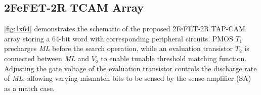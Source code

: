 

\subsection{2FeFET-2R TCAM Array}

\autoref{fig:1x64} demonstrates the schematic of the proposed 2FeFET-2R TAP-CAM array storing a 64-bit word with corresponding peripheral circuits. 
PMOS $\textit{T}_\text{1}$ precharges \textit{ML} before the search operation, while an evaluation transistor $\textit{T}_\text{2}$ is connected between \textit{ML} and $\textit{V}_\text{o}$ to enable tunable threshold matching function. 
Adjusting the gate voltage of the evaluation transistor controls the discharge rate of \textit{ML}, allowing varying mismatch bits to be sensed by the sense amplifier (SA) as a match case. 


